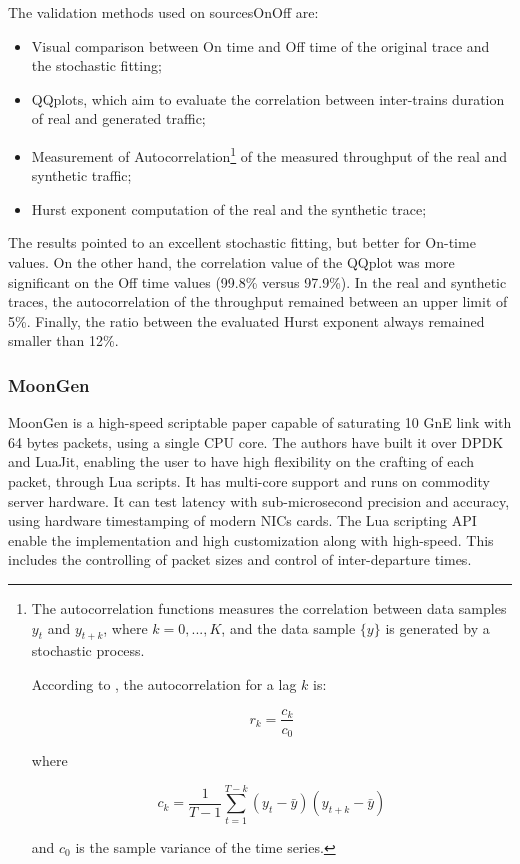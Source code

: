 The validation methods used on sourcesOnOff are: 
\begin{itemize}
	\item Visual comparison between On time and Off time of the original trace and the stochastic fitting;
	\item QQplots, which aim to evaluate the correlation between inter-trains duration of real and generated traffic;
	\item Measurement of Autocorrelation\footnote{
		The autocorrelation functions measures the correlation between data samples $y_{t}$ and $y_{t + k}$, where $k =0, ..., K$, and the data sample $\{y\}$  is generated by a stochastic process.
		
		According to \cite{book-time-series-analysis}, the autocorrelation for a lag $k$ is:
		
		\begin{equation}
		r_{k} = \frac{c_{k}}{c_{0}}
		\end{equation}
		
		where 
		
		\begin{equation}
		c_{k} = \frac{1}{T - 1}\sum_{t = 1}^{T - k} (y_{t} - \bar{y})(y_{t+k} - \bar{y})
		\end{equation}
		
		and $c_{0}$ is the sample variance of the time series. 
	} of the measured throughput of the real and synthetic traffic;
	\item Hurst exponent computation of the real and the synthetic trace;
\end{itemize}

The results pointed to an excellent stochastic fitting, but better for On-time values. On the other hand, the correlation value of the QQplot was more significant on the Off time values (99.8\% versus 97.9\%). In the real and synthetic traces, the autocorrelation of the throughput remained between an upper limit of 5\%. Finally, the ratio between the evaluated Hurst exponent always remained smaller than 12\%.


\subsubsection{MoonGen}

MoonGen\cite{moongen-paper} is a high-speed scriptable paper capable of saturating 10 GnE link with 64 bytes packets, using a single CPU core. The authors have built it over DPDK and LuaJit, enabling the user to have high flexibility on the crafting of each packet, through Lua scripts. It has multi-core support and runs on commodity server hardware. It can test latency with sub-microsecond precision and accuracy, using hardware timestamping of modern NICs cards. The Lua scripting API enable the implementation and high customization along with high-speed. This includes the controlling of packet sizes and control of inter-departure times.

